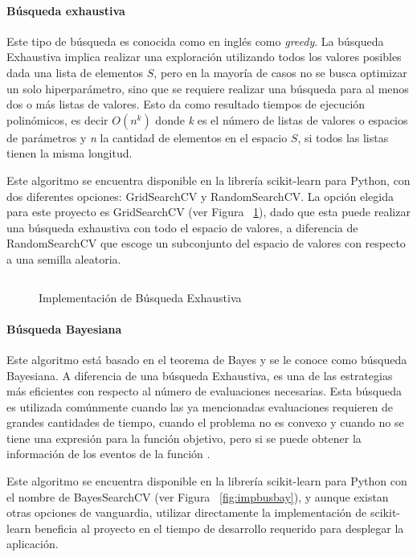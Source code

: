 \paragraph{Búsqueda exhaustiva} Este tipo de búsqueda es conocida como en inglés como \textit{greedy}. La búsqueda Exhaustiva implica realizar una exploración utilizando todos los valores posibles dada una lista de elementos $S$, pero en la mayoría de casos no se busca optimizar un solo hiperparámetro, sino que se requiere realizar una búsqueda para al menos dos o más listas de valores. Esto da como resultado tiempos de ejecución polinómicos, es decir $O(n^k)$ donde \textit{k} es el número de listas de valores o espacios de parámetros y \textit{n} la cantidad de elementos en el espacio $S$, si todos las listas tienen la misma longitud.

Este algoritmo se encuentra disponible en la librería scikit-learn \parencite{sklearn_api} para Python, con dos diferentes opciones: GridSearchCV y RandomSearchCV. La opción elegida para este proyecto es GridSearchCV (ver Figura ~\ref{fig:impbusexh}), dado que esta puede realizar una búsqueda exhaustiva con todo el espacio de valores, a diferencia de RandomSearchCV que escoge un subconjunto del espacio de valores con respecto a una semilla aleatoria.

\begin{figure}[H]
    \centering
    \caption{Implementación de Búsqueda Exhaustiva}
    \inputminted{Python}{pycode/gridsearch.py}
    \label{fig:impbusexh}
\end{figure}

\paragraph{Búsqueda Bayesiana}  Este algoritmo está basado en el teorema de Bayes y se le conoce como búsqueda Bayesiana. A diferencia de una búsqueda Exhaustiva, es una de las estrategias más eficientes con respecto al número de evaluaciones necesarias. Esta búsqueda es utilizada comúnmente cuando las ya mencionadas evaluaciones requieren de grandes cantidades de tiempo, cuando el problema no es convexo y cuando no se tiene una expresión para la función objetivo, pero si se puede obtener la información de los eventos de la función \parencite{Brochu2010}. 

Este algoritmo se encuentra disponible en la librería scikit-learn \parencite{sklearn_api} para Python con el nombre de BayesSearchCV (ver Figura ~\ref{fig:impbusbay}), y aunque existan otras opciones de vanguardia, utilizar directamente la implementación de scikit-learn beneficia al proyecto en el tiempo de desarrollo requerido para desplegar la aplicación.

